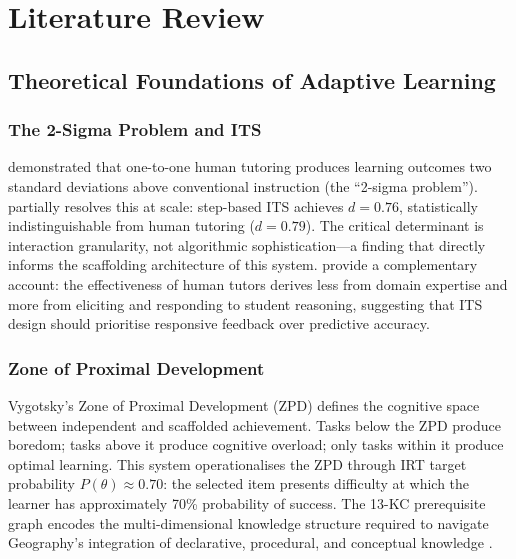 \chapter{Literature Review}
\label{ch:literature_review}

\section{Theoretical Foundations of Adaptive Learning}
\label{sec:lr_theory}

\subsection{The 2-Sigma Problem and ITS}
\label{subsec:lr_2sigma}

\textcite{bloom1984} demonstrated that one-to-one human tutoring produces
learning outcomes two standard deviations above conventional instruction
(the ``2-sigma problem''). \textcite{vanlehn2011} partially resolves this
at scale: step-based ITS achieves $d = 0.76$, statistically indistinguishable
from human tutoring ($d = 0.79$). The critical determinant is interaction
granularity, not algorithmic sophistication---a finding that directly informs
the scaffolding architecture of this system. \textcite{chi2008} provide a
complementary account: the effectiveness of human tutors derives less from
domain expertise and more from eliciting and responding to student reasoning,
suggesting that ITS design should prioritise responsive feedback over
predictive accuracy.

\subsection{Zone of Proximal Development}
\label{subsec:lr_zpd}

Vygotsky's \parencite*{vygotsky1978} Zone of Proximal Development (ZPD)
defines the cognitive space between independent and scaffolded achievement.
Tasks below the ZPD produce boredom; tasks above it produce cognitive overload;
only tasks within it produce optimal learning. This system operationalises
the ZPD through IRT target probability $P(\theta) \approx 0.70$: the selected
item presents difficulty at which the learner has approximately 70\% probability
of success. The 13-KC prerequisite graph encodes the multi-dimensional
knowledge structure required to navigate Geography's integration of declarative,
procedural, and conceptual knowledge \parencite{park2004}.

